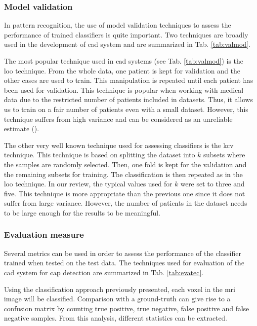 \subsubsection{Model validation}

In pattern recognition, the use of model validation techniques to assess the performance of trained classifiers is quite important. Two techniques are broadly used in the development of \ac{cad} system and are summarized in Tab. \ref{tab:valmod}.

The most popular technique used in \ac{cad} systems (see Tab. \ref{tab:valmod}) is the \acf{loo} technique. From the whole data, one patient is kept for validation and the other cases are used to train. This manipulation is repeated until each patient has been used for validation. This technique is popular when working with medical data due to the restricted number of patients included in datasets. Thus, it allows us to train on a fair number of patients even with a small dataset. However, this technique suffers from high variance and can be considered as an unreliable estimate (\cite{Efron1983}).

The other very well known technique used for assessing classifiers is the \acf{kcv} technique. This technique is based on splitting the dataset into $k$ subsets where the samples are randomly selected. Then, one fold is kept for the validation and the remaining subsets for training. The classification is then repeated as in the \ac{loo} technique. In our review, the typical values used for $k$ were set to three and five. This technique is more appropriate than the previous one since it does not suffer from large variance. However, the number of patients in the dataset needs to be large enough for the results to be meaningful.

\subsubsection{Evaluation measure}\label{subsubsec:eval}

Several metrics can be used in order to assess the performance of the classifier trained when tested on the test data. The techniques used for evaluation of the \ac{cad} system for \ac{cap} detection are summarized in Tab. \ref{tab:evatec}.

Using the classification approach previously presented, each voxel in the \ac{mri} image will be classified. Comparison with a ground-truth can give rise to a confusion matrix by counting true positive, true negative, false positive and false negative samples. From this analysis, different statistics can be extracted. 


